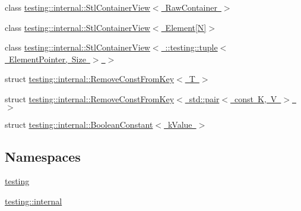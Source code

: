 \begin{DoxyCompactItemize}
\item 
class \mbox{\hyperlink{classtesting_1_1internal_1_1_stl_container_view}{testing\+::internal\+::\+Stl\+Container\+View$<$ Raw\+Container $>$}}
\item 
class \mbox{\hyperlink{classtesting_1_1internal_1_1_stl_container_view_3_01_element[_n]_4}{testing\+::internal\+::\+Stl\+Container\+View$<$ Element\mbox{[}\+N\mbox{]}$>$}}
\item 
class \mbox{\hyperlink{classtesting_1_1internal_1_1_stl_container_view_3_01_1_1testing_1_1tuple_3_01_element_pointer_00_01_size_01_4_01_4}{testing\+::internal\+::\+Stl\+Container\+View$<$ \+::testing\+::tuple$<$ Element\+Pointer, Size $>$ $>$}}
\item 
struct \mbox{\hyperlink{structtesting_1_1internal_1_1_remove_const_from_key}{testing\+::internal\+::\+Remove\+Const\+From\+Key$<$ T $>$}}
\item 
struct \mbox{\hyperlink{structtesting_1_1internal_1_1_remove_const_from_key_3_01std_1_1pair_3_01const_01_k_00_01_v_01_4_01_4}{testing\+::internal\+::\+Remove\+Const\+From\+Key$<$ std\+::pair$<$ const K, V $>$ $>$}}
\item 
struct \mbox{\hyperlink{structtesting_1_1internal_1_1_boolean_constant}{testing\+::internal\+::\+Boolean\+Constant$<$ k\+Value $>$}}
\end{DoxyCompactItemize}
\subsection*{Namespaces}
\begin{DoxyCompactItemize}
\item 
 \mbox{\hyperlink{namespacetesting}{testing}}
\item 
 \mbox{\hyperlink{namespacetesting_1_1internal}{testing\+::internal}}
\end{DoxyCompactItemize}
